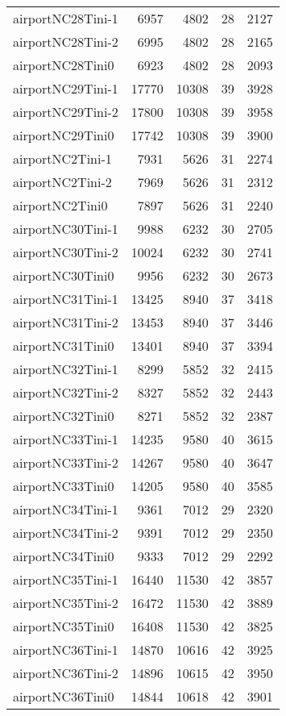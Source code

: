 \begin{longtable}{lrrrr}
airportNC28Tini-1 & 6957 & 4802 & 28 & 2127 \\
airportNC28Tini-2 & 6995 & 4802 & 28 & 2165 \\
airportNC28Tini0 & 6923 & 4802 & 28 & 2093 \\
airportNC29Tini-1 & 17770 & 10308 & 39 & 3928 \\
airportNC29Tini-2 & 17800 & 10308 & 39 & 3958 \\
airportNC29Tini0 & 17742 & 10308 & 39 & 3900 \\
airportNC2Tini-1 & 7931 & 5626 & 31 & 2274 \\
airportNC2Tini-2 & 7969 & 5626 & 31 & 2312 \\
airportNC2Tini0 & 7897 & 5626 & 31 & 2240 \\
airportNC30Tini-1 & 9988 & 6232 & 30 & 2705 \\
airportNC30Tini-2 & 10024 & 6232 & 30 & 2741 \\
airportNC30Tini0 & 9956 & 6232 & 30 & 2673 \\
airportNC31Tini-1 & 13425 & 8940 & 37 & 3418 \\
airportNC31Tini-2 & 13453 & 8940 & 37 & 3446 \\
airportNC31Tini0 & 13401 & 8940 & 37 & 3394 \\
airportNC32Tini-1 & 8299 & 5852 & 32 & 2415 \\
airportNC32Tini-2 & 8327 & 5852 & 32 & 2443 \\
airportNC32Tini0 & 8271 & 5852 & 32 & 2387 \\
airportNC33Tini-1 & 14235 & 9580 & 40 & 3615 \\
airportNC33Tini-2 & 14267 & 9580 & 40 & 3647 \\
airportNC33Tini0 & 14205 & 9580 & 40 & 3585 \\
airportNC34Tini-1 & 9361 & 7012 & 29 & 2320 \\
airportNC34Tini-2 & 9391 & 7012 & 29 & 2350 \\
airportNC34Tini0 & 9333 & 7012 & 29 & 2292 \\
airportNC35Tini-1 & 16440 & 11530 & 42 & 3857 \\
airportNC35Tini-2 & 16472 & 11530 & 42 & 3889 \\
airportNC35Tini0 & 16408 & 11530 & 42 & 3825 \\
airportNC36Tini-1 & 14870 & 10616 & 42 & 3925 \\
airportNC36Tini-2 & 14896 & 10615 & 42 & 3950 \\
airportNC36Tini0 & 14844 & 10618 & 42 & 3901 \\

\end{longtable}
